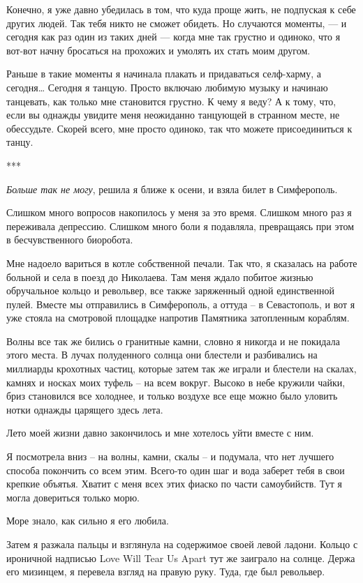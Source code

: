 \documentclass[
]{book}
\begin{document}
Конечно, я уже давно убедилась в том, что куда проще жить, не подпуская к себе других людей. Так тебя никто не сможет обидеть. Но случаются моменты, --- и сегодня как раз один из таких дней --- когда мне так грустно и одиноко, что я вот-вот начну бросаться на прохожих и умолять их стать моим другом.

Раньше в такие моменты я начинала плакать и придаваться селф-харму, а сегодня\ldots{} Сегодня я танцую. Просто включаю любимую музыку и начинаю танцевать, как только мне становится грустно. К чему я веду? А к тому, что, если вы однажды увидите меня неожиданно танцующей в странном месте, не обессудьте. Скорей всего, мне просто одиноко, так что можете присоединиться к танцу.

***

\emph{Больше так не могу}, решила я ближе к осени, и взяла билет в Симферополь.

Слишком много вопросов накопилось у меня за это время. Слишком много раз я переживала депрессию. Слишком много боли я подавляла, превращаясь при этом в бесчувственного биоробота.

Мне надоело вариться в котле собственной печали. Так что, я сказалась на работе больной и села в поезд до Николаева. Там меня ждало побитое жизнью обручальное кольцо и револьвер, все также заряженный одной единственной пулей. Вместе мы отправились в Симферополь, а оттуда -- в Севастополь, и вот я уже стояла на смотровой площадке напротив Памятника затопленным кораблям.

Волны все так же бились о гранитные камни, словно я никогда и не покидала этого места. В лучах полуденного солнца они блестели и разбивались на миллиарды крохотных частиц, которые затем так же играли и блестели на скалах, камнях и носках моих туфель -- на всем вокруг. Высоко в небе кружили чайки, бриз становился все холоднее, и только воздухе все еще можно было уловить нотки однажды царящего здесь лета.

Лето моей жизни давно закончилось и мне хотелось уйти вместе с ним.

Я посмотрела вниз -- на волны, камни, скалы -- и подумала, что нет лучшего способа покончить со всем этим. Всего-то один шаг и вода заберет тебя в свои крепкие объятья. Хватит с меня всех этих фиаско по части самоубийств. Тут я могла довериться только морю.

Море знало, как сильно я его любила.

Затем я разжала пальцы и взглянула на содержимое своей левой ладони. Кольцо с ироничной надписью Love Will Tear Us Apart тут же заиграло на солнце. Держа его мизинцем, я перевела взгляд на правую руку. Туда, где был револьвер.
\end{document}
